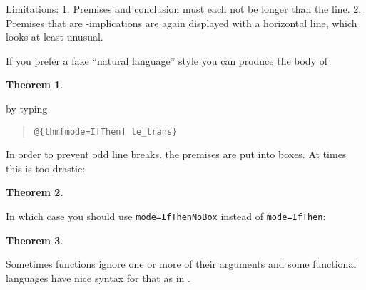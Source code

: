 \begin{isabellebody}
\begin{isamarkuptext}
Limitations: 1. Premises and conclusion must each not be longer than
the line.  2. Premises that are \isa{{\isasymLongrightarrow}}-implications are again
displayed with a horizontal line, which looks at least unusual.%
\end{isamarkuptext}%
\isamarkuptrue%
%
\isamarkuptrue%
%
\begin{isamarkuptext}%
If you prefer a fake ``natural language'' style you can produce
the body of
\newtheorem{theorem}{Theorem}
\begin{theorem}
\end{theorem}
by typing
\begin{quote}
\verb!@!\verb!{thm[mode=IfThen] le_trans}!
\end{quote}

In order to prevent odd line breaks, the premises are put into boxes.
At times this is too drastic:
\begin{theorem}
\end{theorem}
In which case you should use \texttt{mode=IfThenNoBox} instead of
\texttt{mode=IfThen}:
\begin{theorem}
\end{theorem}%
\end{isamarkuptext}%
\isamarkuptrue%
%
\isamarkuptrue%
%
\begin{isamarkuptext}%
Sometimes functions ignore one or more of their
  arguments and some functional languages have nice 
  syntax for that as in .


\end{isamarkuptext}
\end{isabellebody}
